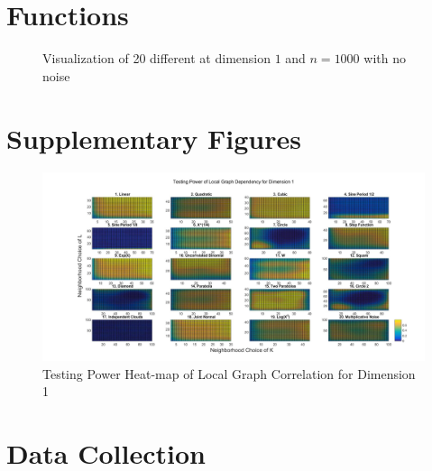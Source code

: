 \documentclass[11pt]{article}
\begin{document}
\appendix

\section{Functions}

\begin{figure}[htbp]
\caption{Visualization of 20 different at dimension $1$ and $n=1000$ with no noise}
\label{fig0}
\end{figure}


\section{Supplementary Figures}
\begin{figure}[htbp]
\includegraphics[width=1.0\textwidth]{../Figures/Fig2s}
\caption{Testing Power Heat-map of Local Graph Correlation for Dimension 1}
\label{figSim2}
\end{figure}


\section{Data Collection}
\end{document}

